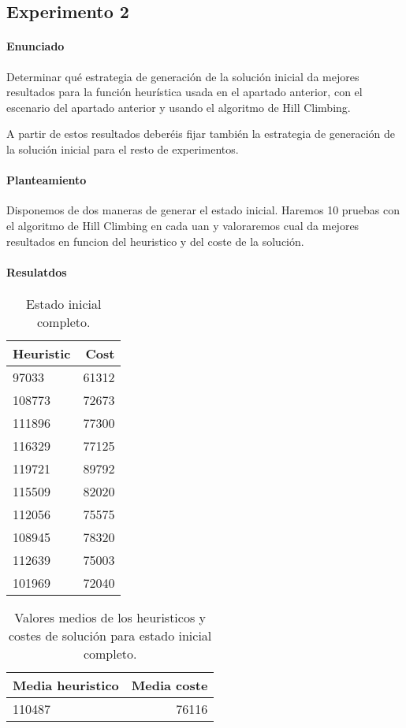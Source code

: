 \subsection{Experimento 2}

\paragraph{Enunciado}

Determinar qué estrategia de generación de la solución inicial da mejores resultados para la función heurística usada en el apartado anterior, con el escenario del apartado anterior y usando el algoritmo de Hill Climbing.

A partir de estos resultados deberéis fijar también la estrategia de generación de la solución inicial para el resto de experimentos.

\paragraph{Planteamiento}
Disponemos de dos maneras de generar el estado inicial. Haremos 10 pruebas con el algoritmo de Hill Climbing en cada uan y valoraremos cual da mejores resultados en funcion del heuristico y del coste de la solución.

\paragraph{Resulatdos}
\begin{table}[htb]
\centering
\begin{tabular}{l|r}
Heuristic & Cost  \\\hline
97033 & 61312 \\
108773 & 72673 \\
111896 & 77300 \\
116329 & 77125 \\
119721 & 89792 \\
115509 & 82020 \\
112056 & 75575 \\
108945 & 78320 \\
112639 & 75003 \\
101969 & 72040 \\

\end{tabular}
\caption{\label{tab:widgets}Estado inicial completo.}
\end{table}

\begin{table}[htb]
\centering
\begin{tabular}{l|r}
Media heuristico & Media coste  \\\hline
110487 & 76116 \\
\end{tabular}
\caption{\label{tab:widgets}Valores medios de los heuristicos y costes de solución para estado inicial completo.}
\end{table}

